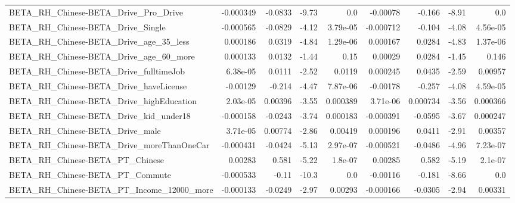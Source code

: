 \begin{tabular}{lrrrrrrrr}
BETA\_RH\_Chinese-BETA\_Drive\_Pro\_Drive               &   -0.000349 &      -0.0833 &     -9.73 &      0.0 &   -0.00078 &      -0.166 &        -8.91 &           0.0 \\
BETA\_RH\_Chinese-BETA\_Drive\_Single                  &   -0.000565 &      -0.0829 &     -4.12 & 3.79e-05 &  -0.000712 &      -0.104 &        -4.08 &      4.56e-05 \\
BETA\_RH\_Chinese-BETA\_Drive\_age\_35\_less             &    0.000186 &       0.0319 &     -4.84 & 1.29e-06 &   0.000167 &      0.0284 &        -4.83 &      1.37e-06 \\
BETA\_RH\_Chinese-BETA\_Drive\_age\_60\_more             &    0.000133 &       0.0132 &     -1.44 &     0.15 &    0.00029 &      0.0284 &        -1.45 &         0.146 \\
BETA\_RH\_Chinese-BETA\_Drive\_fulltimeJob             &    6.38e-05 &       0.0111 &     -2.52 &   0.0119 &   0.000245 &      0.0435 &        -2.59 &       0.00957 \\
BETA\_RH\_Chinese-BETA\_Drive\_haveLicense             &    -0.00129 &       -0.214 &     -4.47 & 7.87e-06 &   -0.00178 &      -0.257 &        -4.08 &      4.59e-05 \\
BETA\_RH\_Chinese-BETA\_Drive\_highEducation           &    2.03e-05 &      0.00396 &     -3.55 & 0.000389 &   3.71e-06 &    0.000734 &        -3.56 &      0.000366 \\
BETA\_RH\_Chinese-BETA\_Drive\_kid\_under18             &   -0.000158 &      -0.0243 &     -3.74 & 0.000183 &  -0.000391 &     -0.0595 &        -3.67 &      0.000247 \\
BETA\_RH\_Chinese-BETA\_Drive\_male                    &    3.71e-05 &      0.00774 &     -2.86 &  0.00419 &   0.000196 &      0.0411 &        -2.91 &       0.00357 \\
BETA\_RH\_Chinese-BETA\_Drive\_moreThanOneCar          &   -0.000431 &      -0.0424 &     -5.13 & 2.97e-07 &  -0.000521 &     -0.0486 &        -4.96 &      7.23e-07 \\
BETA\_RH\_Chinese-BETA\_PT\_Chinese                    &     0.00283 &        0.581 &     -5.22 &  1.8e-07 &    0.00285 &       0.582 &        -5.19 &       2.1e-07 \\
BETA\_RH\_Chinese-BETA\_PT\_Commute                    &   -0.000533 &        -0.11 &     -10.3 &      0.0 &   -0.00116 &      -0.181 &        -8.66 &           0.0 \\
BETA\_RH\_Chinese-BETA\_PT\_Income\_12000\_more          &   -0.000133 &      -0.0249 &     -2.97 &  0.00293 &  -0.000166 &     -0.0305 &        -2.94 &       0.00331 \\

\end{tabular}
